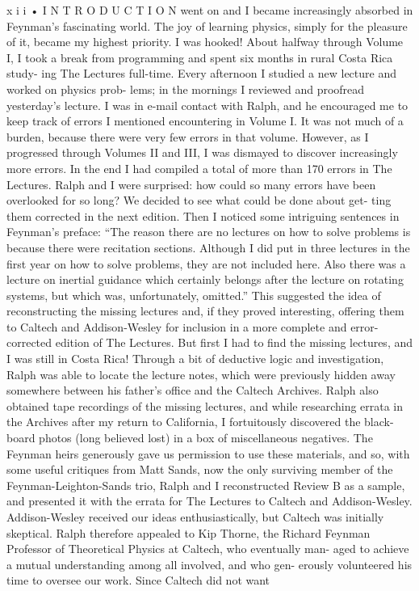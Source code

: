\documentclass[11pt,oneside]{article}
\begin{document}
x i i • I N T R O D U C T I O N went on and I became increasingly absorbed in Feynman’s fascinating world. The joy of learning physics, simply for the pleasure of it, became my highest priority. I was hooked! About halfway through Volume I, I took a break from programming and spent six months in rural Costa Rica study- ing The Lectures full-time. Every afternoon I studied a new lecture and worked on physics prob- lems; in the mornings I reviewed and proofread yesterday’s lecture. I was in e-mail contact with Ralph, and he encouraged me to keep track of errors I mentioned encountering in Volume I. It was not much of a burden, because there were very few errors in that volume. However, as I progressed through Volumes II and III, I was dismayed to discover increasingly more errors. In the end I had compiled a total of more than 170 errors in The Lectures. Ralph and I were surprised: how could so many errors have been overlooked for so long? We decided to see what could be done about get- ting them corrected in the next edition. Then I noticed some intriguing sentences in Feynman’s preface: “The reason there are no lectures on how to solve problems is because there were recitation sections. Although I did put in three lectures in the first year on how to solve problems, they are not included here. Also there was a lecture on inertial guidance which certainly belongs after the lecture on rotating systems, but which was, unfortunately, omitted.” This suggested the idea of reconstructing the missing lectures and, if they proved interesting, offering them to Caltech and Addison-Wesley for inclusion in a more complete and error-corrected edition of The Lectures. But first I had to find the missing lectures, and I was still in Costa Rica! Through a bit of deductive logic and investigation, Ralph was able to locate the lecture notes, which were previously hidden away somewhere between his father’s office and the Caltech Archives. Ralph also obtained tape recordings of the missing lectures, and while researching errata in the Archives after my return to California, I fortuitously discovered the black- board photos (long believed lost) in a box of miscellaneous negatives. The Feynman heirs generously gave us permission to use these materials, and so, with some useful critiques from Matt Sands, now the only surviving member of the Feynman-Leighton-Sands trio, Ralph and I reconstructed Review B as a sample, and presented it with the errata for The Lectures to Caltech and Addison-Wesley. Addison-Wesley received our ideas enthusiastically, but Caltech was initially skeptical. Ralph therefore appealed to Kip Thorne, the Richard Feynman Professor of Theoretical Physics at Caltech, who eventually man- aged to achieve a mutual understanding among all involved, and who gen- erously volunteered his time to oversee our work. Since Caltech did not want\par
\end{document}
